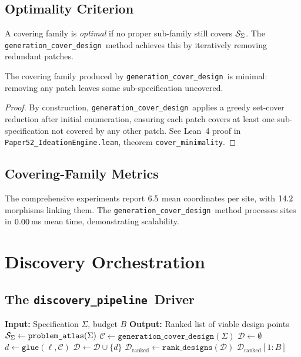 \documentclass[11pt]{article}
\newcommand{\DiscPipe}{\texttt{discovery\_pipeline}}
\newcommand{\GenCover}{\texttt{generation\_cover\_design}}
\begin{document}
\subsection{Optimality Criterion}
A covering family is \emph{optimal} if no proper sub-family still
covers $\mathcal{S}_\Sigma$.  The \GenCover\ method achieves this by
iteratively removing redundant patches.

\begin{theorem}\label{thm:cover-minimality}
The covering family produced by \GenCover\ is minimal: removing any
patch leaves some sub-specification uncovered.
\end{theorem}

\begin{proof}
By construction, \GenCover\ applies a greedy set-cover reduction
after initial enumeration, ensuring each patch covers at least one
sub-specification not covered by any other patch.  See Lean~4 proof
in \texttt{Paper52\_IdeationEngine.lean}, theorem
\texttt{cover\_minimality}.
\end{proof}

\subsection{Covering-Family Metrics}
The comprehensive experiments report $6.5$ mean
coordinates per site, with $14.2$ morphisms
linking them.  The \GenCover\ method processes sites in
$0.00$\,ms mean time, demonstrating
scalability.

\section{Discovery Orchestration}\label{sec:discovery}

\subsection{The \DiscPipe\ Driver}

\begin{algorithm}[H]
\caption{Ideation Discovery Pipeline}
\label{alg:discovery}
\begin{algorithmic}[1]
\STATE \textbf{Input:} Specification $\Sigma$, budget $B$
\STATE \textbf{Output:} Ranked list of viable design points
\STATE $\mathcal{S}_\Sigma \gets \texttt{problem\_atlas}(\Sigma)$
\STATE $\mathcal{C} \gets \texttt{generation\_cover\_design}(\Sigma)$
\STATE $\mathcal{D} \gets \emptyset$ 
    \STATE $d \gets \texttt{glue}(\ell, \mathcal{C})$
      \STATE $\mathcal{D} \gets \mathcal{D} \cup \{d\}$
    \ENDIF
  \ENDFOR
\ENDFOR
\STATE $\mathcal{D}_\text{ranked} \gets \texttt{rank\_designs}(\mathcal{D})$
\RETURN $\mathcal{D}_\text{ranked}[1{:}B]$
\end{algorithmic}
\end{algorithm}
\end{document}
